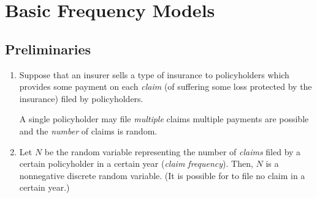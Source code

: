 \section{Basic Frequency Models}
\label{sect:freq-model}
\subsection{Preliminaries}
\begin{enumerate}
\item Suppose that an insurer  sells a type of insurance to
policyholders which provides some payment  on each
\emph{claim}  (of suffering some loss protected by
the insurance) filed by policyholders.

\begin{note}
A single policyholder  may file \emph{multiple} claims
 multiple payments   are possible and
the \emph{number} of claims is random.
\end{note}

\item Let \(N\) be the random variable representing the number of \emph{claims}
 filed by a certain policyholder  in a
certain year (\emph{claim frequency}). Then, \(N\) is a nonnegative discrete
random variable. (It is possible for  to file no claim in a
certain year.)


\end{enumerate}
